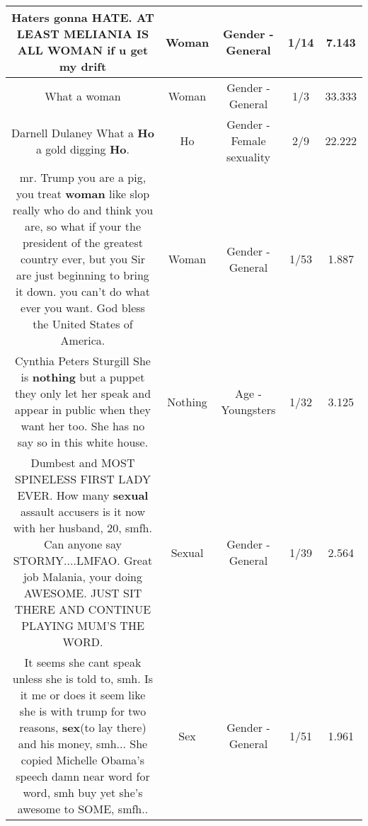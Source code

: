 \documentclass[11pt]{article}
\newlength\mylength
\begin{document}
\begin{center}
\begin{longtable}{|C{.65\mylength}|C{.30\mylength}|C{.12\mylength}|C{.12\mylength}|C{.12\mylength}|}
  \small Haters gonna HATE.  AT LEAST MELIANIA IS ALL \textbf{WOMAN}  if u get my drift\normalsize   & Woman & Gender - General & 1/14 & 7.143 \\  \hline
  \small What a woman\normalsize   & Woman & Gender - General & 1/3 & 33.333 \\  \hline
  \small Darnell Dulaney What a \textbf{Ho} a gold digging \textbf{Ho}.\normalsize   & Ho & Gender - Female sexuality & 2/9 & 22.222 \\  \hline
  \small mr. Trump you  are  a pig, you  treat  \textbf{woman} like slop really  who do and think  you are,  so what  if your the president of the greatest  country ever, but you Sir are  just  beginning  to bring it down.  you  can't  do what ever you  want.  God bless  the United States  of America.\normalsize   & Woman & Gender - General & 1/53 & 1.887 \\  \hline
  \small Cynthia Peters Sturgill She is \textbf{nothing} but a puppet they only let her speak and appear in public when they want her too. She has no say so in this white house.\normalsize   & Nothing & Age - Youngsters & 1/32 & 3.125 \\  \hline
  \small Dumbest and MOST SPINELESS FIRST LADY EVER.   How many \textbf{sexual} assault accusers is it now with her husband, 20, smfh.   Can anyone say STORMY....LMFAO.    Great job Malania, your doing AWESOME.   JUST SIT THERE AND CONTINUE PLAYING MUM'S THE WORD.\normalsize   & Sexual & Gender - General & 1/39 & 2.564 \\  \hline
  \small It seems she cant speak unless she is told to, smh. Is it me or does it seem like she is with trump for two reasons, \textbf{sex}(to lay there) and his money, smh... She copied Michelle Obama's speech damn near word for word, smh buy yet she's awesome to SOME, smfh..\normalsize   & Sex & Gender - General & 1/51 & 1.961 \\  \hline

\end{longtable}
\end{center}
\end{document}
